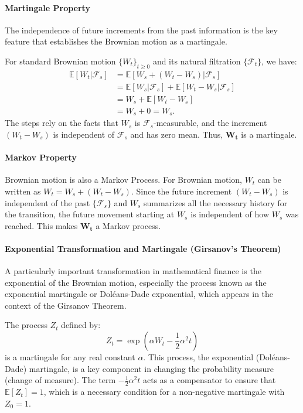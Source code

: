 \paragraph{Martingale Property}
The independence of future increments from the past information is the key feature that establishes the Brownian motion as a martingale.


For standard Brownian motion $\{W_t\}_{t \ge 0}$ and its natural filtration $\{\mathcal{F}_t\}$, we have:
\begin{align*}
\mathbb{E}[W_t | \mathcal{F}_s] &= \mathbb{E}[W_s + (W_t - W_s) | \mathcal{F}_s] \\
&= \mathbb{E}[W_s | \mathcal{F}_s] + \mathbb{E}[W_t - W_s | \mathcal{F}_s] \\
&= W_s + \mathbb{E}[W_t - W_s] \\
&= W_s + 0 = W_s.
\end{align*}
The steps rely on the facts that $W_s$ is $\mathcal{F}_s$-measurable, and the increment $(W_t - W_s)$ is independent of $\mathcal{F}_s$ and has zero mean. Thus, $\mathbf{W_t}$ is a martingale.
\paragraph{Markov Property}
Brownian motion is also a Markov Process. 
For Brownian motion, $W_t$ can be written as $W_t = W_s + (W_t - W_s)$. Since the future increment $(W_t - W_s)$ is independent of the past $\{\mathcal{F}_s\}$ and $W_s$ summarizes all the necessary history for the transition, the future movement starting at $W_s$ is independent of how $W_s$ was reached. This makes $\mathbf{W_t}$ a Markov process.
\paragraph{Exponential Transformation and Martingale (Girsanov's Theorem)}
A particularly important transformation in mathematical finance is the exponential of the Brownian motion, especially the process known as the exponential martingale or Doléans-Dade exponential, which appears in the context of the Girsanov Theorem.

The process $Z_t$ defined by:
\[
Z_t = \exp \left( \alpha W_t - \frac{1}{2} \alpha^2 t \right)
\]
is a martingale for any real constant $\alpha$. This process, the exponential (Dol\'eans-Dade) martingale, is a key component in changing the probability measure (change of measure). The term $-\frac{1}{2}\alpha^2 t$ acts as a compensator to ensure that $\mathbb{E}[Z_t] = 1$, which is a necessary condition for a non-negative martingale with $Z_0=1$.

